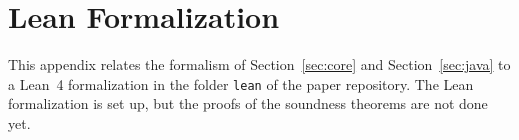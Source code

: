 \section{Lean Formalization}
\label{app:lean}
\lstset{breaklines=true}
\newcommand{\leanfile}[1]{\texttt{lean/Funnelling/#1}}
\newsavebox{\fitbox}
\newcommand{\fit}[1]{\sbox{\fitbox}{#1}\ifdim\wd\fitbox>\linewidth\resizebox{\linewidth}{!}{\usebox{\fitbox}}\else\usebox{\fitbox}\fi}
\newenvironment{cmp}[1]{\par\medskip\noindent\begin{minipage}{\textwidth}\textbf{#1}\par\smallskip\noindent}{\end{minipage}\par}
\newenvironment{paperside}{\begin{minipage}[t]{0.45\textwidth}\vspace{0pt}\scriptsize}{\end{minipage}\hfill}
\newenvironment{leanside}{\begin{minipage}[t]{0.53\textwidth}\vspace{0pt}}{\end{minipage}}
\newcommand{\mapping}[1]{\par\smallskip\noindent{\scriptsize\textit{Mapping.} #1}\par\smallskip\hrule}

This appendix relates the formalism of Section~\ref{sec:core} and Section~\ref{sec:java} to a Lean~4 formalization in the folder \texttt{lean} of the paper repository.
The Lean formalization is set up, but the proofs of the soundness theorems are not done yet.

